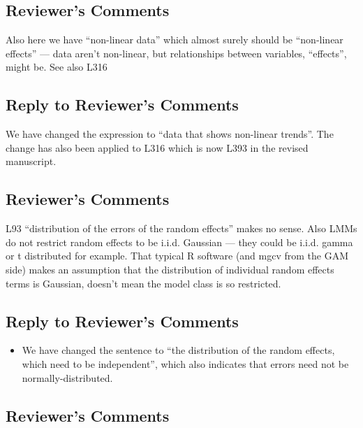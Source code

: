 \documentclass[
]{article}
\providecommand{\tightlist}{%
  \setlength{\itemsep}{0pt}\setlength{\parskip}{0pt}}
\begin{document}
\hypertarget{reviewers-comments-18}{%
\subsection{Reviewer's Comments}\label{reviewers-comments-18}}

Also here we have ``non-linear data'' which almost surely should be ``non-linear effects'' --- data aren't non-linear, but relationships between variables, ``effects'', might be. See also L316

\hypertarget{section-19}{%
\subsection{\texorpdfstring{\textcolor{reviewersblue} {Reply to Reviewer's Comments}}{}}\label{section-19}}

We have changed the expression to ``data that shows non-linear trends''. The change has also been applied to L316 which is now L393 in the revised manuscript.

\hypertarget{reviewers-comments-19}{%
\subsection{Reviewer's Comments}\label{reviewers-comments-19}}

L93 ``distribution of the errors of the random effects'' makes no sense. Also LMMs do not restrict random effects to be i.i.d. Gaussian --- they could be i.i.d. gamma or t distributed for example. That typical R software (and mgcv from the GAM side) makes an assumption that the distribution of individual random effects terms is Gaussian, doesn't mean the model class is so restricted.

\hypertarget{section-20}{%
\subsection{\texorpdfstring{\textcolor{reviewersblue} {Reply to Reviewer's Comments}}{}}\label{section-20}}

\begin{itemize}
\tightlist
\item
  We have changed the sentence to ``the distribution of the random effects, which need to be independent'', which also indicates that errors need not be normally-distributed.
\end{itemize}

\hypertarget{reviewers-comments-20}{%
\subsection{Reviewer's Comments}\label{reviewers-comments-20}}
\end{document}
